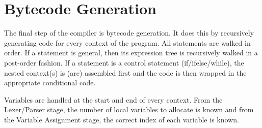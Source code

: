 \documentclass{standalone}
\begin{document}
	\section{Bytecode Generation}
		The final step of the compiler is bytecode generation. It does this by recursively generating code for every context of the program. All statements are walked in order. If a statement is general, then its expression tree is recursively walked in a post-order fashion. If a statement is a control statement (if/ifelse/while), the nested context(s) is (are) assembled first and the code is then wrapped in the appropriate conditional code.

		Variables are handled at the start and end of every context. From the Lexer/Parser stage, the number of local variables to allocate is known and from the Variable Assignment stage, the correct index of each variable is known.
\end{document}
